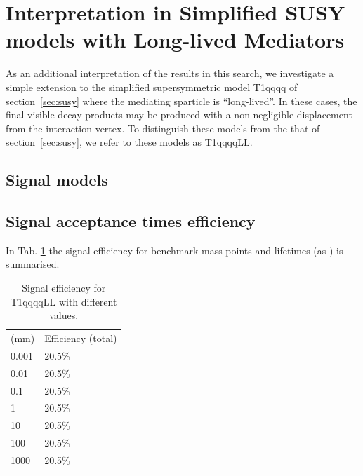 \section{Interpretation in Simplified SUSY models with Long-lived Mediators}
\label{sec:LLP}

As an additional interpretation of the results in this search, we investigate a simple extension to the 
simplified supersymmetric model T1qqqq of section~\ref{sec:susy} where the mediating sparticle is ``long-lived''.
In these cases, the final visible decay products may be produced with a non-negligible displacement from the interaction vertex.
To distinguish these models from the that of section~\ref{sec:susy}, we refer to these models as T1qqqqLL.


\subsection{Signal models}
\label{sec:LLP_models}


\clearpage
\subsection{Signal acceptance times efficiency}
\label{sec:sig-accept-contam-LLP}

In Tab. \ref{tab:sig-eff-LLP} the signal efficiency for benchmark mass
points and lifetimes (as \ctau) is summarised.

\begin{table}[h!]
    \scriptsize
	\caption{Signal efficiency for T1qqqqLL with different \ctau values.}
    \label{tab:sig-eff-LLP}
    \centering
    \begin{tabular}{ ll }
        \hline \hline
	    \ctau (mm) & Efficiency (total) \\ 
            0.001 & 20.5\% \\
            0.01  & 20.5\% \\
            0.1   & 20.5\% \\
            1     & 20.5\% \\
            10    & 20.5\% \\
            100   & 20.5\% \\
            1000  & 20.5\% \\
        \hline \hline
    \end{tabular}
\end{table}

